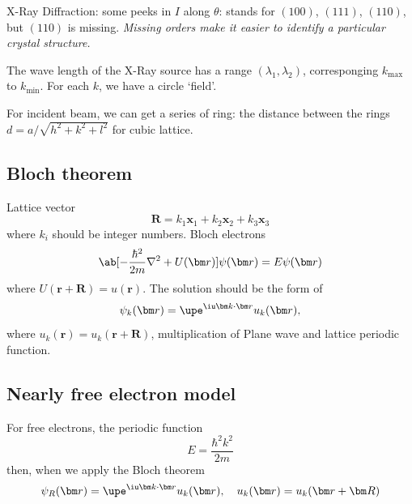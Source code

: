 X-Ray Diffraction: some peeks in $I$ along $\theta$: stands for $(100)$, $(111)$, $(110)$, but $(110)$ is missing.
\emph{Missing orders make it easier to identify a particular crystal structure.}

The wave length of the X-Ray source has a range $(\lambda_1, \lambda_2)$,
corresponging $k_{\max}$ to $k_{\min}$.
For each $k$, we have a circle `field'.

For incident beam, we can get a series of ring: the distance between the rings
$d = a/\sqrt{h^2 + k^2 + l^2}$ for cubic lattice.

\subsection{Bloch theorem}

Lattice vector
\[
  \bm R = k_1 \bm x_1 + k_2 \bm x_2 + k_3 \bm x_3
\]
where $k_i$ should be integer numbers.
Bloch electrons
\[
  \ab[-\frac{\hbar^2}{2m} \nabla^2 + U(\bm r)] \psi(\bm r) = E\psi(\bm r)
\]
where $U(\bm r + \bm R) = u(\bm r)$.
The solution should be the form of
\begin{equation}
  \psi_k(\bm r) = \upe^{\iu\bm k \cdot \bm r} u_k(\bm r),
\end{equation}
where $u_k(\bm r) = u_k(\bm r + \bm R)$,
multiplication of Plane wave and lattice periodic function.

\subsection{Nearly free electron model}

For free electrons, the periodic function
\begin{equation}
  E = \frac{\hbar^2k^2}{2m}
\end{equation}
then, when we apply the Bloch theorem
\[
  \psi_R(\bm r) = \upe^{\iu \bm k \cdot \bm r} u_k(\bm r), \quad
  u_k(\bm r) = u_k(\bm r + \bm R)
\]

